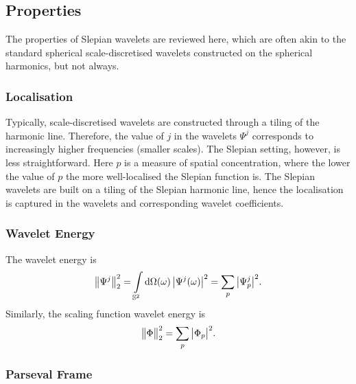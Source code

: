 

\subsection{Properties}\label{sec:chapter3_properties}

The properties of Slepian wavelets are reviewed here, which are often akin to the standard spherical scale-discretised wavelets constructed on the spherical harmonics, but not always.

\subsubsection{Localisation}\label{sec:chapter3_localisation}

Typically, scale-discretised wavelets are constructed through a tiling of the harmonic line.
Therefore, the value of \(j\) in the wavelets \(\Psi^{j}\) corresponds to increasingly higher frequencies (smaller scales).
The Slepian setting, however, is less straightforward.
Here \(p\) is a measure of spatial concentration, where the lower the value of \(p\) the more well-localised the Slepian function is.
The Slepian wavelets are built on a tiling of the Slepian harmonic line, hence the localisation is captured in the wavelets and corresponding wavelet coefficients.

\subsubsection{Wavelet Energy}

The wavelet energy is
%
\begin{equation}
	{\big\lVert\Psi^{j}\big\rVert}_{2}^{2}
	= \int\limits_{\mathbb{S}^{2}} \dd{\Omega(\omega)} \big\lvert\Psi^{j}(\omega)\big\rvert^{2}
	= \sum\limits_{p} \big\lvert{\Psi}_{p}^{j}\big\rvert^{2}.
\end{equation}
%
Similarly, the scaling function wavelet energy is
%
\begin{equation}
	{\big\lVert\Phi\big\rVert}_{2}^{2}
	= \sum\limits_{p} \big\lvert{\Phi}_{p}\big\rvert^{2}.
\end{equation}

\subsubsection{Parseval Frame}


